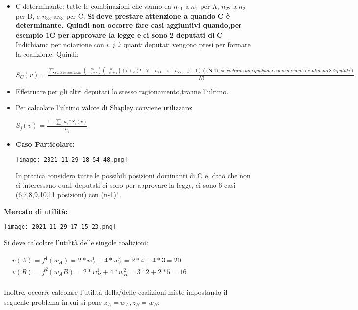 \documentclass{article}
\theoremstyle{definition}
\theoremstyle{remark}
\begin{document}
\begin{itemize}
    \item C determinante: tutte le combinazioni che vanno da \(n_11\) a \(n_1\) per A, \(n_22\) a \(n_2\) per B, e \(n_33\) a\(n_3\) per C.\newline
    \textbf{Si deve prestare attenzione a quando C è determinante. Quindi non occorre fare casi aggiuntivi quando,per esempio 1C per approvare la legge e ci sono 2 deputati di C}\newline
    Indichiamo per notazione con \(i,j,k\) quanti deputati vengono presi per formare la coalizione. Quindi:
    \begin{center}
        \(S_C(v)=\frac{\sum_{Tutte\ le\ coalizioni}\binom{n_1}{n_{11}+i}\binom{n_2}{n_{22}+j}(i+j)!(N-n_{11}-i-n_{22}-j-1) (\textbf{(N-1)!}\ se\ richiede\ una\ qualsiasi\ combinazione\ i.e.\ almeno\ 8\ deputati)}{N!}\)
    \end{center}
    \item Effettuare per gli altri deputati lo stesso ragionamento,tranne l'ultimo.
    \item Per calcolare l'ultimo valore di Shapley conviene utilizzare:
    \begin{center}
        \(S_j(v)=\frac{1-\sum_{i}n_i*S_i(v)}{n_j}\)
    \end{center}
    \item \textbf{Caso Particolare:}\begin{center}
        \texttt{[image: 2021-11-29-18-54-48.png]}
    \end{center}
    In pratica considero tutte le possibili posizioni dominanti di C e, dato che non ci interessano quali deputati ci sono per approvare la legge, ci sono 6 casi (6,7,8,9,10,11 posizioni) con (n-1)!.
\end{itemize}
\textbf{Mercato di utilità:}
\begin{center}
    \texttt{[image: 2021-11-29-17-15-23.png]}
\end{center}
Si deve calcolare l'utilità delle singole coalizioni:
\begin{center}
    $\begin{aligned}
        & v(A)=f^1(w_A)=2*w_A^1+4*w_A^2=2*4+4*3=20\\
        & v(B)=f^2(w_AB)=2*w_B^1+4*w_B^2=3*2+2*5=16\\
    \end{aligned}$
\end{center}
Inoltre, occorre calcolare l'utilità della/delle coalizioni miste impostando il seguente problema in cui si pone \(z_A=w_A,z_B=w_B\):
\end{document}

